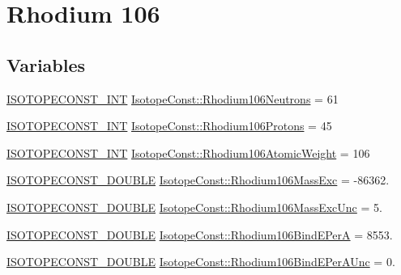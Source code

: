 \hypertarget{group___isotope_const-_rhodium-_rh106}{}\section{Rhodium 106}
\label{group___isotope_const-_rhodium-_rh106}
\subsection*{Variables}
\begin{DoxyCompactItemize}
\item 
\mbox{\hyperlink{group___isotope_const-_macros_ga5f18360b3e99483a35c32d789e62621c}{I\+S\+O\+T\+O\+P\+E\+C\+O\+N\+S\+T\+\_\+\+I\+NT}} \mbox{\hyperlink{group___isotope_const-_rhodium-_rh106_gaee72e07df9964de0cf49ca08cf4e73ff}{Isotope\+Const\+::\+Rhodium106\+Neutrons}} = 61
\item 
\mbox{\hyperlink{group___isotope_const-_macros_ga5f18360b3e99483a35c32d789e62621c}{I\+S\+O\+T\+O\+P\+E\+C\+O\+N\+S\+T\+\_\+\+I\+NT}} \mbox{\hyperlink{group___isotope_const-_rhodium-_rh106_gaee63df6b5511b448eb7b1fbcda6dd8ce}{Isotope\+Const\+::\+Rhodium106\+Protons}} = 45
\item 
\mbox{\hyperlink{group___isotope_const-_macros_ga5f18360b3e99483a35c32d789e62621c}{I\+S\+O\+T\+O\+P\+E\+C\+O\+N\+S\+T\+\_\+\+I\+NT}} \mbox{\hyperlink{group___isotope_const-_rhodium-_rh106_gacb00e0e79fe176884307a68be82c4dd3}{Isotope\+Const\+::\+Rhodium106\+Atomic\+Weight}} = 106
\item 
\mbox{\hyperlink{group___isotope_const-_macros_ga8f45a7272ce02c0b4c65c44636ed719a}{I\+S\+O\+T\+O\+P\+E\+C\+O\+N\+S\+T\+\_\+\+D\+O\+U\+B\+LE}} \mbox{\hyperlink{group___isotope_const-_rhodium-_rh106_ga0bca150c966bef7c6fe67f761bf6a2f7}{Isotope\+Const\+::\+Rhodium106\+Mass\+Exc}} = -\/86362.
\item 
\mbox{\hyperlink{group___isotope_const-_macros_ga8f45a7272ce02c0b4c65c44636ed719a}{I\+S\+O\+T\+O\+P\+E\+C\+O\+N\+S\+T\+\_\+\+D\+O\+U\+B\+LE}} \mbox{\hyperlink{group___isotope_const-_rhodium-_rh106_gaae2ccd11852d349f0bac85eb86633050}{Isotope\+Const\+::\+Rhodium106\+Mass\+Exc\+Unc}} = 5.
\item 
\mbox{\hyperlink{group___isotope_const-_macros_ga8f45a7272ce02c0b4c65c44636ed719a}{I\+S\+O\+T\+O\+P\+E\+C\+O\+N\+S\+T\+\_\+\+D\+O\+U\+B\+LE}} \mbox{\hyperlink{group___isotope_const-_rhodium-_rh106_ga54f87196706dc00fa346a4fe139347bb}{Isotope\+Const\+::\+Rhodium106\+Bind\+E\+PerA}} = 8553.
\item 
\mbox{\hyperlink{group___isotope_const-_macros_ga8f45a7272ce02c0b4c65c44636ed719a}{I\+S\+O\+T\+O\+P\+E\+C\+O\+N\+S\+T\+\_\+\+D\+O\+U\+B\+LE}} \mbox{\hyperlink{group___isotope_const-_rhodium-_rh106_ga1bda4dffeb4ca9fb22c2a156d04a2000}{Isotope\+Const\+::\+Rhodium106\+Bind\+E\+Per\+A\+Unc}} = 0.

\end{DoxyCompactItemize}
